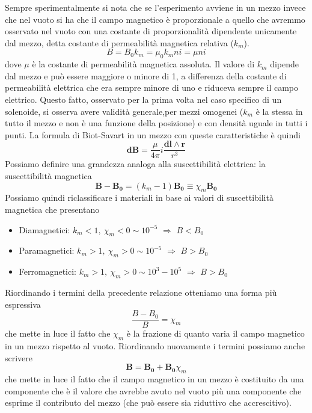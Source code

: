 \documentclass[
10pt, %
a4paper, %
oneside, %
headinclude,footinclude, %
BCOR5mm, %
]{scrartcl}
\begin{document}
Sempre sperimentalmente si nota che se l'esperimento avviene in un mezzo invece che nel vuoto si ha che il campo magnetico è proporzionale a quello che avremmo osservato nel vuoto con una costante di proporzionalità dipendente unicamente dal mezzo, detta costante di permeabilità magnetica relativa (\(k_m\)).
\[B = B_0 k_m = \mu_0 k_m n i = \mu n i\]
dove $\mu$ è la costante di permeabilità magnetica assoluta. 
Il valore di \(k_m\) dipende dal mezzo e può essere maggiore o minore di 1, a differenza della costante di permeabilità elettrica che era sempre minore di uno e riduceva sempre il campo elettrico. Questo fatto, osservato per la prima volta nel caso specifico di un solenoide, si osserva avere validità generale,per mezzi omogenei (\(k_m\) è la stessa in tutto il mezzo e non è una funzione della posizione) e con densità uguale in tutti i punti. La formula di Biot-Savart in un mezzo con queste caratteristiche è quindi 
\[\mathbf{dB} = \frac{\mu}{4\pi} i \frac{\mathbf{dl}\wedge \mathbf{r}}{r^3}\] 
Possiamo definire una grandezza analoga alla suscettibilità elettrica: la suscettibilità magnetica 
\[\mathbf{B}-\mathbf{B_0}=(k_m - 1)\mathbf{B_0} \equiv \chi_m \mathbf{B_0}\]
Possiamo quindi riclassificare i materiali in base ai valori di suscettibilità magnetica che presentano
\begin{itemize}
	\item Diamagnetici: \(k_m <1,\ \chi_m < 0\sim 10^{-5}\) \(\Rightarrow\) \(B< B_0\)
	\item Paramagnetici: \(k_m >1,\ \chi_m > 0\sim 10^{-5}\) \(\Rightarrow\) \(B > B_0\)
	\item Ferromagnetici: \(k_m > 1,\ \chi_m > 0\sim 10^{3}-10^{5}\) \(\Rightarrow\) \(B > B_0\)
\end{itemize}
Riordinando i termini della precedente relazione otteniamo una forma più espressiva
\[\frac{B-B_0}{B}=\chi_m\]
che mette in luce il fatto che $\chi_m$ è la frazione di quanto varia il campo magnetico in un mezzo rispetto al vuoto. Riordinando nuovamente i termini possiamo anche scrivere
\[\mathbf{B}=\mathbf{B_0}+\mathbf{B_0}\chi_m\]
che mette in luce il fatto che il campo magnetico in un mezzo è costituito da una componente che è il valore che avrebbe avuto nel vuoto più una componente che esprime il contributo del mezzo (che può essere sia riduttivo che accrescitivo). 
\end{document}
